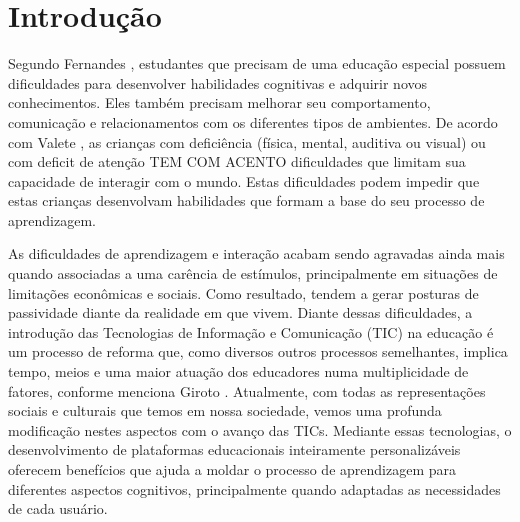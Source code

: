 
\chapter{Introdução} \label{Cap:Introducao}

Segundo Fernandes \cite{fernandez2013mobile}, estudantes que precisam de uma educação especial possuem dificuldades para desenvolver habilidades cognitivas e adquirir novos conhecimentos. Eles também precisam melhorar seu comportamento, comunicação e relacionamentos com os diferentes tipos de ambientes. De acordo com Valete \cite{hasselbring2000use}, as crianças com deficiência (física, mental, auditiva ou visual) ou com deficit de atenção TEM COM ACENTO dificuldades que limitam sua capacidade de interagir com o mundo. Estas dificuldades podem impedir que estas crianças desenvolvam habilidades que formam a base do seu processo de aprendizagem.

As dificuldades de aprendizagem e interação acabam sendo agravadas ainda mais quando associadas a uma carência de estímulos, principalmente em situações de limitações econômicas e sociais. Como resultado, tendem a gerar posturas de passividade diante da realidade em que vivem. Diante dessas dificuldades, a introdução das Tecnologias de Informação e Comunicação (TIC) na educação é um processo de reforma que, como diversos outros processos semelhantes, implica tempo, meios e uma maior atuação dos educadores numa multiplicidade de fatores, conforme menciona Giroto \cite{giroto2012tecnologias}. Atualmente, com todas as representações sociais e culturais que temos em nossa sociedade, vemos uma profunda modificação nestes aspectos com o avanço das TICs. Mediante essas tecnologias, o desenvolvimento de plataformas educacionais inteiramente personalizáveis oferecem benefícios que ajuda a moldar o processo de aprendizagem para diferentes aspectos cognitivos, principalmente quando adaptadas as necessidades de cada usuário.


